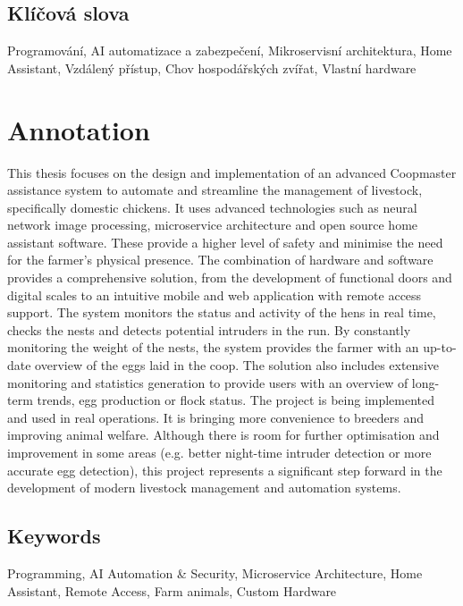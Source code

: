 \documentclass{template/socthesis}
\begin{document}
    \subsection*{Klíčová slova}
    Programování, AI automatizace a zabezpečení, Mikroservisní architektura, Home Assistant, Vzdálený přístup, Chov hospodářských zvířat, Vlastní hardware

    \vspace{20mm}

    \section*{Annotation}
    This thesis focuses on the design and implementation of an advanced Coopmaster assistance system to automate and streamline the management of livestock, specifically domestic chickens.
    It uses advanced technologies such as neural network image processing, microservice architecture and open source home assistant software.
    These provide a higher level of safety and minimise the need for the farmer's physical presence.
    The combination of hardware and software provides a comprehensive solution, from the development of functional doors and digital scales to an intuitive mobile and web application with remote access support.
    The system monitors the status and activity of the hens in real time, checks the nests and detects potential intruders in the run.
    By constantly monitoring the weight of the nests, the system provides the farmer with an up-to-date overview of the eggs laid in the coop.
    The solution also includes extensive monitoring and statistics generation to provide users with an overview of long-term trends, egg production or flock status.
    The project is being implemented and used in real operations.
    It is bringing more convenience to breeders and improving animal welfare.
    Although there is room for further optimisation and improvement in some areas (e.g. better night-time intruder detection or more accurate egg detection), this project represents a significant step forward in the development of modern livestock management and automation systems.
    \subsection*{Keywords}
    Programming, AI Automation \& Security, Microservice Architecture, Home Assistant, Remote Access, Farm animals, Custom Hardware

    \pagestyle{plain}
\end{document}

